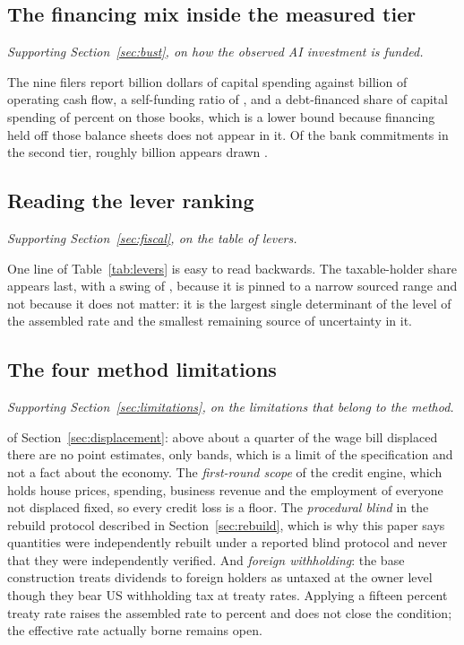 \subsection{The financing mix inside the measured tier}

\emph{Supporting Section~\ref{sec:bust}, on how the observed AI investment is funded.}

The nine filers report  billion dollars of capital spending against
 billion of operating cash flow, a self-funding ratio of
, and a debt-financed share of capital spending of
 percent on those books, which is a lower bound because financing held
off those balance sheets does not appear in it. Of the bank commitments in the second tier,
roughly  billion appears drawn \citep{CohenKillenLau2026}.

\subsection{Reading the lever ranking}

\emph{Supporting Section~\ref{sec:fiscal}, on the table of levers.}

One line of Table~\ref{tab:levers} is easy to read backwards. The taxable-holder share appears
last, with a swing of , because it is pinned to a narrow sourced range and not
because it does not matter: it is the largest single determinant of the level of the assembled
rate and the smallest remaining source of uncertainty in it.

\subsection{The four method limitations}

\emph{Supporting Section~\ref{sec:limitations}, on the limitations that belong to the method.}

of Section~\ref{sec:displacement}: above about a quarter of the wage bill displaced
there are no point estimates, only bands, which is a limit of the specification and not a fact
about the economy. The \emph{first-round scope} of the credit engine, which holds house prices,
spending, business revenue and the employment of everyone not displaced fixed, so every credit
loss is a floor. The \emph{procedural blind} in the rebuild protocol described in
Section~\ref{sec:rebuild}, which is why this paper says quantities were independently rebuilt
under a reported blind protocol and never that they were independently verified. And
\emph{foreign withholding}: the base construction treats dividends to foreign holders as untaxed
at the owner level though they bear US withholding tax at treaty rates. Applying a fifteen percent
treaty rate raises the assembled rate to  percent and does not close the
condition; the effective rate actually borne remains open.

